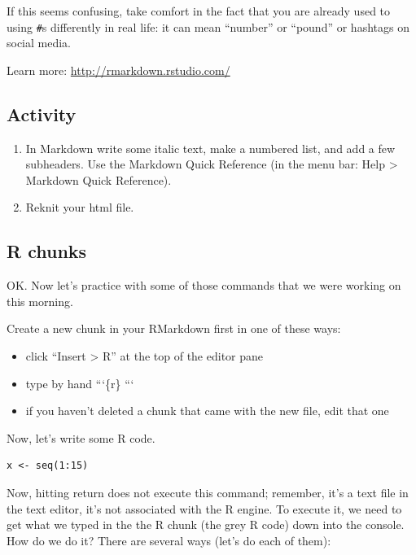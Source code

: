 \documentclass[]{book}
\providecommand{\tightlist}{%
  \setlength{\itemsep}{0pt}\setlength{\parskip}{0pt}}
\begin{document}
If this seems confusing, take comfort in the fact that you are already used to using \texttt{\#}s differently in real life: it can mean ``number'' or ``pound'' or hashtags on social media.

Learn more: \url{http://rmarkdown.rstudio.com/}

\hypertarget{activity}{%
\subsection{Activity}\label{activity}}

\begin{enumerate}
\def\labelenumi{\arabic{enumi}.}
\tightlist
\item
  In Markdown write some italic text, make a numbered list, and add a few subheaders.
  Use the Markdown Quick Reference (in the menu bar: Help \textgreater{} Markdown Quick Reference).
\item
  Reknit your html file.
\end{enumerate}

\hypertarget{r-chunks}{%
\subsection{R chunks}\label{r-chunks}}

OK. Now let's practice with some of those commands that we were working on this morning.

Create a new chunk in your RMarkdown first in one of these ways:

\begin{itemize}
\tightlist
\item
  click ``Insert \textgreater{} R'' at the top of the editor pane
\item
  type by hand
  ```\{r\}
  ```
\item
  if you haven't deleted a chunk that came with the new file, edit that one
\end{itemize}

Now, let's write some R code.

\begin{verbatim}
x <- seq(1:15)
\end{verbatim}

Now, hitting return does not execute this command; remember, it's a text file in the text editor, it's not associated with the R engine. To execute it, we need to get what we typed in the the R chunk (the grey R code) down into the console. How do we do it? There are several ways (let's do each of them):
\end{document}
